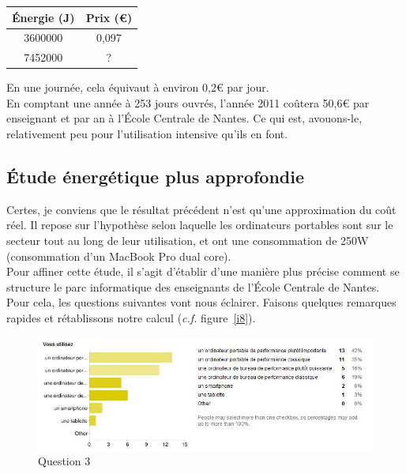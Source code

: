 \documentclass[a4paper,11pt,french]{report}
\begin{document}
\begin{center}
\begin{tabular}{|c|c|}
\hline  Énergie (J)	& Prix (\euro{})  \\ 
\hline  3600000 &  0,097\\ 
\hline  7452000 & ? \\ 
\hline 
\end{tabular} 
\end{center}

En une journée, cela équivaut à environ 0,2\euro{} par jour.\\

En comptant une année à 253 jours ouvrés, l'année 2011 coûtera 50,6\euro{} par enseignant et par an à l'École Centrale de Nantes. Ce qui est, avouons-le, relativement peu pour l'utilisation intensive qu'ils en font.\\



\subsection{Étude énergétique plus approfondie}

Certes, je conviens que le résultat précédent n'est qu'une approximation du coût réel. Il repose sur l'hypothèse selon laquelle les ordinateurs portables sont sur le secteur tout au long de leur utilisation, et ont une consommation de 250W (consommation d'un MacBook Pro dual core).\\

Pour affiner cette étude, il s'agit d'établir d'une manière plus précise comment se structure le parc informatique des enseignants de l'École Centrale de Nantes. Pour cela, les questions suivantes vont nous éclairer. Faisons quelques remarques rapides et rétablissons notre calcul (\textit{c.f.} figure~\vref{i8}).\\

\begin{figure}[h!]
\includegraphics[width=\textwidth]{i8.JPG}
\caption{Question 3}
\label{i8}
\end{figure}
\end{document}
